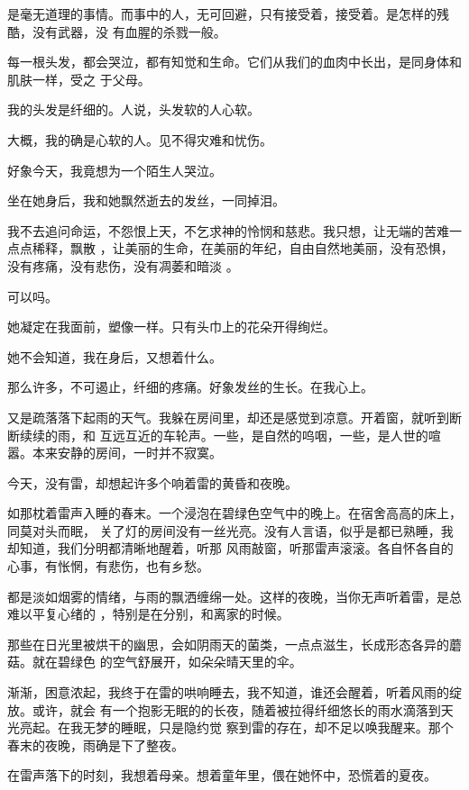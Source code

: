 \documentclass[12pt,a4paper]{article}
\begin{document}
		是毫无道理的事情。而事中的人，无可回避，只有接受着，接受着。是怎样的残酷，没有武器，没
	有血腥的杀戮一般。

		每一根头发，都会哭泣，都有知觉和生命。它们从我们的血肉中长出，是同身体和肌肤一样，受之
	于父母。

		我的头发是纤细的。人说，头发软的人心软。

		大概，我的确是心软的人。见不得灾难和忧伤。


		好象今天，我竟想为一个陌生人哭泣。

		坐在她身后，我和她飘然逝去的发丝，一同掉泪。

		我不去追问命运，不怨恨上天，不乞求神的怜悯和慈悲。我只想，让无端的苦难一点点稀释，飘散
	，让美丽的生命，在美丽的年纪，自由自然地美丽，没有恐惧，没有疼痛，没有悲伤，没有凋萎和暗淡
	。

		可以吗。

		她凝定在我面前，塑像一样。只有头巾上的花朵开得绚烂。

		她不会知道，我在身后，又想着什么。

		那么许多，不可遏止，纤细的疼痛。好象发丝的生长。在我心上。

	\endwriting



		又是疏落落下起雨的天气。我躲在房间里，却还是感觉到凉意。开着窗，就听到断断续续的雨，和
	互远互近的车轮声。一些，是自然的呜咽，一些，是人世的喧嚣。本来安静的房间，一时并不寂寞。


		今天，没有雷，却想起许多个响着雷的黄昏和夜晚。


		如那枕着雷声入睡的春末。一个浸泡在碧绿色空气中的晚上。在宿舍高高的床上，同莫对头而眠，
	关了灯的房间没有一丝光亮。没有人言语，似乎是都已熟睡，我却知道，我们分明都清晰地醒着，听那
	风雨敲窗，听那雷声滚滚。各自怀各自的心事，有怅惘，有悲伤，也有乡愁。


		都是淡如烟雾的情绪，与雨的飘洒缠绵一处。这样的夜晚，当你无声听着雷，是总难以平复心绪的
	，特别是在分别，和离家的时候。

		那些在日光里被烘干的幽思，会如阴雨天的菌类，一点点滋生，长成形态各异的蘑菇。就在碧绿色
	的空气舒展开，如朵朵晴天里的伞。

		渐渐，困意浓起，我终于在雷的哄响睡去，我不知道，谁还会醒着，听着风雨的绽放。或许，就会
	有一个抱影无眠的的长夜，随着被拉得纤细悠长的雨水滴落到天光亮起。在我无梦的睡眠，只是隐约觉
	察到雷的存在，却不足以唤我醒来。那个春末的夜晚，雨确是下了整夜。


		在雷声落下的时刻，我想着母亲。想着童年里，偎在她怀中，恐慌着的夏夜。
\end{document}
